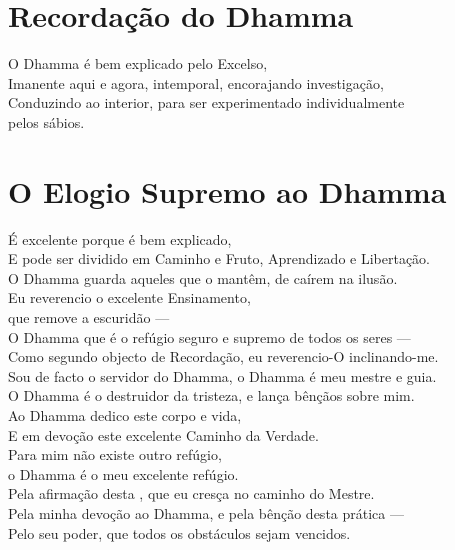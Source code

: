 \clearpage

\chapter{Recordação do Dhamma}

\begin{leader}
\end{leader}

O Dhamma é bem explicado pelo Excelso,\\
Imanente aqui e agora, intemporal, encorajando investigação,\\
Conduzindo ao interior, para ser experimentado individualmente\\
\vin pelos sábios.

\nextChapterUseDelegatedPageNumber

\chapter{O Elogio Supremo ao Dhamma}

\begin{leader}
\end{leader}

É excelente porque é bem explicado,\\
E pode ser dividido em Caminho e Fruto, Aprendizado e Libertação.\\
O Dhamma guarda aqueles que o mantêm, de caírem na ilusão.\\
Eu reverencio o excelente Ensinamento,\\
\vin que remove a escuridão ---\\
O Dhamma que é o refúgio seguro e supremo de todos os seres ---\\
Como segundo objecto de Recordação, eu reverencio-O inclinando-me.\\
Sou de facto o servidor do Dhamma, o Dhamma é meu mestre e guia.\\
O Dhamma é o destruidor da tristeza, e lança bênçãos sobre mim.\\
Ao Dhamma dedico este corpo e vida,\\
E em devoção  este excelente Caminho da Verdade.\\
Para mim não existe outro refúgio,\\
\vin o Dhamma é o meu excelente refúgio.\\
Pela afirmação desta , que eu cresça no caminho do Mestre.\\
Pela minha devoção ao Dhamma, e pela bênção desta prática ---\\
Pelo seu poder, que todos os obstáculos sejam vencidos.

